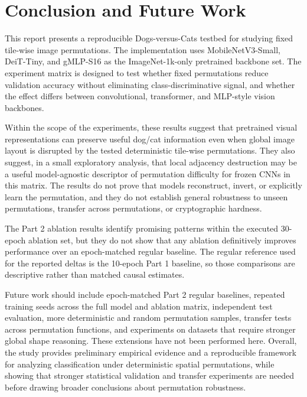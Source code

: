 \documentclass[12pt]{article}
\begin{document}
\section{Conclusion and Future Work}

This report presents a reproducible Dogs-versus-Cats testbed for studying fixed tile-wise image permutations. The implementation uses MobileNetV3-Small, DeiT-Tiny, and gMLP-S16 as the ImageNet-1k-only pretrained backbone set. The experiment matrix is designed to test whether fixed permutations reduce validation accuracy without eliminating class-discriminative signal, and whether the effect differs between convolutional, transformer, and MLP-style vision backbones.

Within the scope of the experiments, these results suggest that pretrained visual representations can preserve useful dog/cat information even when global image layout is disrupted by the tested deterministic tile-wise permutations. They also suggest, in a small exploratory analysis, that local adjacency destruction may be a useful model-agnostic descriptor of permutation difficulty for frozen CNNs in this matrix. The results do not prove that models reconstruct, invert, or explicitly learn the permutation, and they do not establish general robustness to unseen permutations, transfer across permutations, or cryptographic hardness.

The Part 2 ablation results identify promising patterns within the executed 30-epoch ablation set, but they do not show that any ablation definitively improves performance over an epoch-matched regular baseline. The regular reference used for the reported deltas is the 10-epoch Part 1 baseline, so those comparisons are descriptive rather than matched causal estimates.

Future work should include epoch-matched Part 2 regular baselines, repeated training seeds across the full model and ablation matrix, independent test evaluation, more deterministic and random permutation samples, transfer tests across permutation functions, and experiments on datasets that require stronger global shape reasoning. These extensions have not been performed here. Overall, the study provides preliminary empirical evidence and a reproducible framework for analyzing classification under deterministic spatial permutations, while showing that stronger statistical validation and transfer experiments are needed before drawing broader conclusions about permutation robustness.
\end{document}
